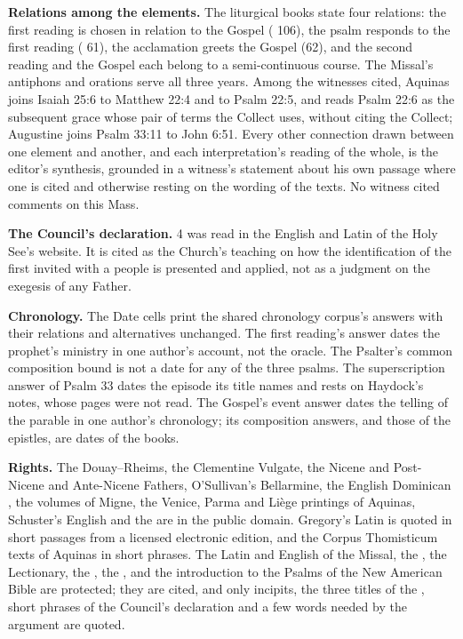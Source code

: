 {\textbf{Relations among the elements.} The liturgical books state four
relations: the first reading is chosen in relation to the Gospel
( 106), the psalm responds to the first reading
( 61), the acclamation greets
the Gospel (62), and the second reading and the Gospel each belong to a
semi-continuous course. The Missal's antiphons and orations serve all three
years. Among the witnesses cited, Aquinas joins Isaiah 25:6 to Matthew 22:4
and to Psalm 22:5, and reads Psalm 22:6 as the subsequent grace whose pair of
terms the Collect uses, without citing the Collect; Augustine joins Psalm
33:11 to John 6:51. Every other connection drawn between one element and
another, and each interpretation's reading of the whole, is the editor's
synthesis, grounded in a witness's statement about his own passage where one
is cited and otherwise resting on the wording of the texts. No witness cited
comments on this Mass.

\textbf{The Council's declaration.}  4 was read in the
English and Latin of the Holy See's website. It is cited as the Church's
teaching on how the identification of the first invited with a people is
presented and applied, not as a judgment on the exegesis of any Father.

\textbf{Chronology.} The Date cells print the shared chronology corpus's
answers with their relations and alternatives unchanged. The first reading's
answer dates the prophet's ministry in one author's account, not the oracle.
The Psalter's common composition bound is not a date for any of the three
psalms. The superscription answer of Psalm 33 dates the episode its title
names and rests on Haydock's notes, whose pages were not read. The Gospel's
event answer dates the telling of the parable in one author's chronology; its
composition answers, and those of the epistles, are dates of the books.

\textbf{Rights.} The Douay--Rheims, the Clementine Vulgate, the Nicene and
Post-Nicene and Ante-Nicene Fathers, O'Sullivan's Bellarmine, the English
Dominican , the volumes of Migne, the Venice, Parma and Li\`ege
printings of Aquinas, Schuster's English and the 
are in the public domain. Gregory's Latin is quoted in short passages from a
licensed electronic edition, and the Corpus Thomisticum texts of Aquinas in
short phrases. The Latin and English of the Missal, the , the Lectionary, the , the ,  and the introduction to the Psalms of the New
American Bible are protected; they are cited, and only incipits, the three
titles of the , short phrases of the Council's declaration and a
few words needed by the argument are quoted.
\par}

